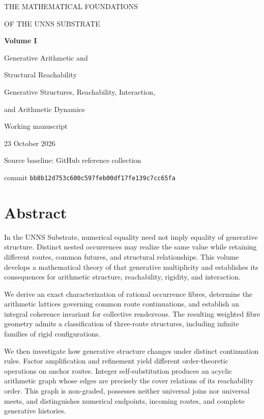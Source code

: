\documentclass[11pt,oneside,openany]{book}
\theoremstyle{definition}
\theoremstyle{remark}
\begin{document}
\frontmatter
\begin{titlepage}
\centering
\vspace*{30mm}
{\Large THE MATHEMATICAL FOUNDATIONS\par}
\vspace{4mm}
{\Large OF THE UNNS SUBSTRATE\par}
\vspace{17mm}
{\Huge\bfseries Volume I\par}
\vspace{5mm}
{\LARGE Generative Arithmetic and\par Structural Reachability\par}
\vspace{20mm}
{\large Generative Structures, Reachability, Interaction,\par and Arithmetic Dynamics\par}
\vfill
{\large Working manuscript\par}
{\large 23 October 2026\par}
\vspace{6mm}
{\normalsize Source baseline: GitHub reference collection\par commit \texttt{bb8b12d753c600c597feb00df17fe139c7cc65fa}\par}
\end{titlepage}
\chapter*{Abstract}
In the UNNS Substrate, numerical equality need not imply equality of generative structure. Distinct nested occurrences may realize the same value while retaining different routes, common futures, and structural relationships. This volume develops a mathematical theory of that generative multiplicity and establishes its consequences for arithmetic structure, reachability, rigidity, and interaction.

We derive an exact characterization of rational occurrence fibres, determine the arithmetic lattices governing common route continuations, and establish an integral coherence invariant for collective rendezvous. The resulting weighted fibre geometry admits a classification of three-route structures, including infinite families of rigid configurations.

We then investigate how generative structure changes under distinct continuation rules. Factor amplification and refinement yield different order-theoretic operations on anchor routes. Integer self-substitution produces an acyclic arithmetic graph whose edges are precisely the cover relations of its reachability order. This graph is non-graded, possesses neither universal joins nor universal meets, and distinguishes numerical endpoints, incoming routes, and complete generative histories.
\end{document}
